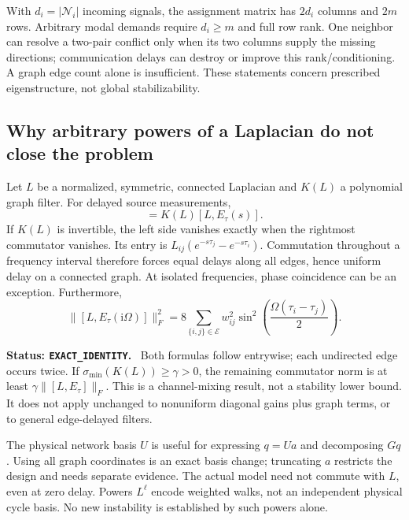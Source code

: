 \documentclass[11pt]{article}
\newcommand{\ii}{\mathrm{i}}
\newcommand{\status}[1]{\par\smallskip\noindent\textbf{Status: \texttt{#1}.}\ }
\begin{document}
With $d_i=|\mathcal N_i|$ incoming signals, the assignment matrix has
$2d_i$ columns and $2m$ rows. Arbitrary modal demands require
$d_i\ge m$ and full row rank. One neighbor can resolve a two-pair
conflict only when its two columns supply the missing directions;
communication delays can destroy or improve this rank/conditioning.
A graph edge count alone is insufficient. These statements concern
prescribed eigenstructure, not global stabilizability.

\subsection{Why arbitrary powers of a Laplacian do not close the problem}
Let $L$ be a normalized, symmetric, connected Laplacian and $K(L)$
a polynomial graph filter. For delayed source measurements,
\begin{equation}
 [L,K(L)E_\tau(s)]=K(L)[L,E_\tau(s)]. \label{eq:polycomm}
\end{equation}
If $K(L)$ is invertible, the left side vanishes exactly when the
rightmost commutator vanishes. Its entry is
$L_{ij}(e^{-s\tau_j}-e^{-s\tau_i})$.
Commutation throughout a frequency interval therefore forces equal
delays along all edges, hence uniform delay on a connected graph.
At isolated frequencies, phase coincidence can be an exception.
Furthermore,
\begin{equation}
 \|[L,E_\tau(\ii\Omega)]\|_F^2
 =8\sum_{\{i,j\}\in\mathcal E}w_{ij}^2
       \sin^2\!\left(\frac{\Omega(\tau_i-\tau_j)}2\right).
 \label{eq:freqcomm}
\end{equation}
\status{EXACT\_IDENTITY}
Both formulas follow entrywise; each undirected edge occurs twice.
If $\sigma_{\min}(K(L))\ge\gamma>0$, the remaining commutator norm
is at least $\gamma\|[L,E_\tau]\|_F$.
This is a channel-mixing result, not a stability lower bound.
It does not apply unchanged to nonuniform diagonal gains plus
graph terms, or to general edge-delayed filters.

The physical network basis $U$ is useful for expressing $q=Ua$ and
decomposing $Gq$. Using all graph coordinates is an exact basis
change; truncating $a$ restricts the design and needs separate evidence.
The actual model need not commute with $L$, even at zero delay.
Powers $L^\ell$ encode weighted walks, not an independent physical
cycle basis. No new instability is established by such powers alone.
\end{document}

